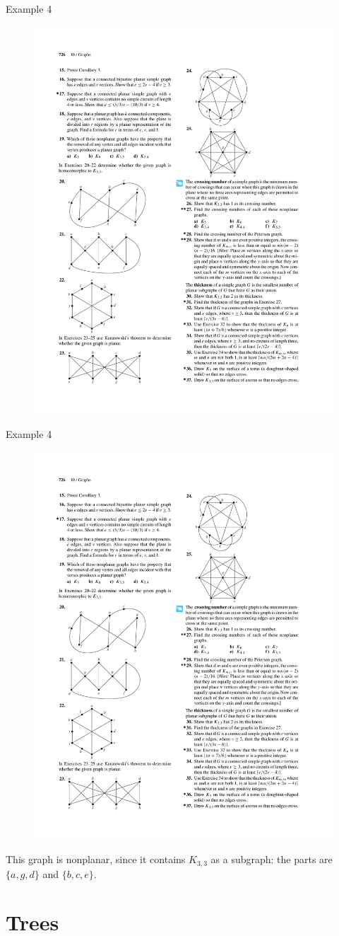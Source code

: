 \documentclass{beamer}
\theoremstyle{definition}
\begin{document}
\begin{frame}{Example 4}
    \begin{figure}
        \includegraphics[trim={11.5cm 17cm 5.5cm 7.25cm}, clip, width=.5\linewidth]{p726}
    \end{figure}
\end{frame}

\begin{frame}{Example 4}
    \begin{figure}
        \includegraphics[trim={11.5cm 17cm 5.5cm 7.25cm}, clip, width=.5\linewidth]{p726}
    \end{figure}
    \centering
    This graph is nonplanar, since it contains $K_{3,3}$ as a subgraph: the parts are $\{a, g, d\}$ and $\{b, c, e\}$.
\end{frame}

\section{Trees}
\end{document}
